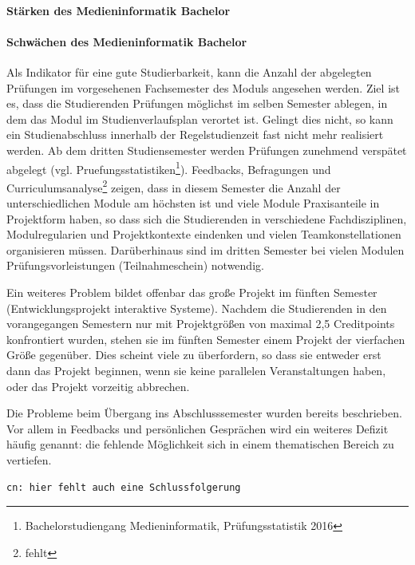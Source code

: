 \paragraph{Stärken des Medieninformatik
Bachelor}\label{stuxe4rken-des-medieninformatik-bachelor}

\paragraph{Schwächen des Medieninformatik
Bachelor}\label{schwuxe4chen-des-medieninformatik-bachelor}

Als Indikator für eine gute Studierbarkeit, kann die Anzahl der
abgelegten Prüfungen im vorgesehenen Fachsemester des Moduls angesehen
werden. Ziel ist es, dass die Studierenden Prüfungen möglichst im selben
Semester ablegen, in dem das Modul im Studienverlaufsplan verortet ist.
Gelingt dies nicht, so kann ein Studienabschluss innerhalb der
Regelstudienzeit fast nicht mehr realisiert werden. Ab dem dritten
Studiensemester werden Prüfungen zunehmend verspätet abgelegt (vgl.
Pruefungsstatistiken\footnote{Bachelorstudiengang Medieninformatik,
  Prüfungsstatistik 2016}). Feedbacks, Befragungen und
Curriculumsanalyse\footnote{fehlt} zeigen, dass in diesem Semester die
Anzahl der unterschiedlichen Module am höchsten ist und viele Module
Praxisanteile in Projektform haben, so dass sich die Studierenden in
verschiedene Fachdisziplinen, Modulregularien und Projektkontexte
eindenken und vielen Teamkonstellationen organisieren müssen.
Darüberhinaus sind im dritten Semester bei vielen Modulen
Prüfungsvorleistungen (Teilnahmeschein) notwendig.

Ein weiteres Problem bildet offenbar das große Projekt im fünften
Semester (Entwicklungsprojekt interaktive Systeme). Nachdem die
Studierenden in den vorangegangen Semestern nur mit Projektgrößen von
maximal 2,5 Creditpoints konfrontiert wurden, stehen sie im fünften
Semester einem Projekt der vierfachen Größe gegenüber. Dies scheint
viele zu überfordern, so dass sie entweder erst dann das Projekt
beginnen, wenn sie keine parallelen Veranstaltungen haben, oder das
Projekt vorzeitig abbrechen.

Die Probleme beim Übergang ins Abschlusssemester wurden bereits
beschrieben. Vor allem in Feedbacks und persönlichen Gesprächen wird ein
weiteres Defizit häufig genannt: die fehlende Möglichkeit sich in einem
thematischen Bereich zu vertiefen.

\begin{verbatim}
cn: hier fehlt auch eine Schlussfolgerung
\end{verbatim}


